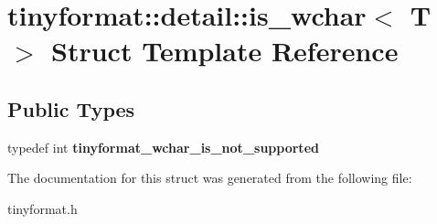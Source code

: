 \hypertarget{structtinyformat_1_1detail_1_1is__wchar}{}\section{tinyformat\+:\+:detail\+:\+:is\+\_\+wchar$<$ T $>$ Struct Template Reference}
\label{structtinyformat_1_1detail_1_1is__wchar}
\subsection*{Public Types}
\begin{DoxyCompactItemize}
\item 
\mbox{\label{structtinyformat_1_1detail_1_1is__wchar_a2006c700bf3264d6002993949bbaaac9}} 
typedef int {\bfseries tinyformat\+\_\+wchar\+\_\+is\+\_\+not\+\_\+supported}
\end{DoxyCompactItemize}


The documentation for this struct was generated from the following file\+:\begin{DoxyCompactItemize}
\item 
tinyformat.\+h\end{DoxyCompactItemize}
